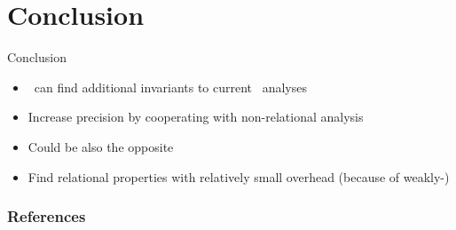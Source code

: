 \documentclass{beamer}
\begin{document}
\section{Conclusion}
\frame{\tableofcontents[currentsection]}

\begin{frame}{Conclusion}
    \begin{itemize}
        \item \cpo\ can find additional invariants to current \goblint\ analyses
        \item Increase precision by cooperating with non-relational analysis
        \item Could be also the opposite
        \item Find relational properties with relatively small overhead (because of weakly-)
    \end{itemize}
\end{frame}

\appendix

\begin{frame}[allowframebreaks]
    \frametitle{References}
    
    
\end{frame}
\end{document}
